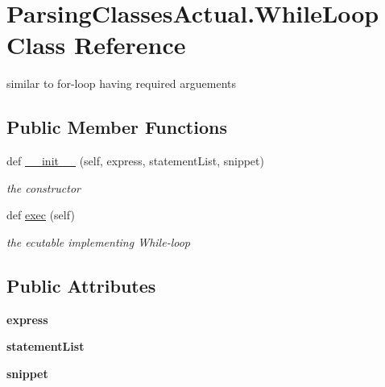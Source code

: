 \hypertarget{class_parsing_classes_actual_1_1_while_loop}{}\section{Parsing\+Classes\+Actual.\+While\+Loop Class Reference}
\label{class_parsing_classes_actual_1_1_while_loop}


similar to for-\/loop having required arguements  


\subsection*{Public Member Functions}
\begin{DoxyCompactItemize}
\item 
def \hyperlink{class_parsing_classes_actual_1_1_while_loop_adf4ccccee2acf19cea376f4ebb9dfd66}{\+\_\+\+\_\+init\+\_\+\+\_\+} (self, express, statement\+List, snippet)
\begin{DoxyCompactList}\small\item\em the constructor \end{DoxyCompactList}\item 
def \hyperlink{class_parsing_classes_actual_1_1_while_loop_a458309ab7ca3701811c3561488ad2940}{exec} (self)\hypertarget{class_parsing_classes_actual_1_1_while_loop_a458309ab7ca3701811c3561488ad2940}{}\label{class_parsing_classes_actual_1_1_while_loop_a458309ab7ca3701811c3561488ad2940}

\begin{DoxyCompactList}\small\item\em the ecutable implementing While-\/loop \end{DoxyCompactList}\end{DoxyCompactItemize}
\subsection*{Public Attributes}
\begin{DoxyCompactItemize}
\item 
{\bfseries express}\hypertarget{class_parsing_classes_actual_1_1_while_loop_a81fb2f8bd34b6e7a3e31a1afa5331cb5}{}\label{class_parsing_classes_actual_1_1_while_loop_a81fb2f8bd34b6e7a3e31a1afa5331cb5}

\item 
{\bfseries statement\+List}\hypertarget{class_parsing_classes_actual_1_1_while_loop_a0274f797bd8e0c3a3e260796acf14d6d}{}\label{class_parsing_classes_actual_1_1_while_loop_a0274f797bd8e0c3a3e260796acf14d6d}

\item 
{\bfseries snippet}\hypertarget{class_parsing_classes_actual_1_1_while_loop_a1c7300045f672d208fdee2f590bb5084}{}\label{class_parsing_classes_actual_1_1_while_loop_a1c7300045f672d208fdee2f590bb5084}

\end{DoxyCompactItemize}



